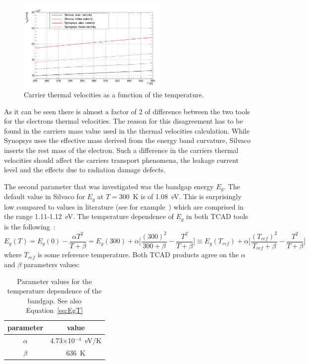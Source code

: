 \begin{figure}[!htbp]
\centering
\includegraphics[width=0.65\textwidth]{vtherm}
\caption{\label{fig:vtherm}Carrier thermal velocities as a function of the temperature.}
\end{figure}
\noindent As it can be seen there is almost a factor of 2 of difference between the two tools for the electrons 
thermal velocities. The reason for this disagreement has to be found in the carriers  mass value
used in the thermal velocities calculation. While Synopsys uses the effective  mass derived 
from the energy band curvature, Silvaco inserts the rest mass of the electron. 
Such a difference in the  carriers thermal velocities should affect the carriers transport phenomena, 
the leakage current level and the effects due to radiation damage defects. 
 
 The second parameter that was investigated was the bandgap energy $E_g$. The default value in 
 Silvaco for $E_g$ at $T=$300~K is of 1.08~eV. This is surprisingly low compared to values in literature 
 (see for example~\cite{Lutz:411172,Sze1981,Wang1989,Shockley}) which are comprised 
 in the range 1.11-1.12~eV.
The temperature dependence of $E_g$ in both TCAD tools is the following~\cite{Sze1981}:
\begin{equation}
E_g(T)=E_g(0) -\dfrac{\alpha T^2}{T+\beta}=E_g(300)+\alpha\Bigg[ \dfrac{(300)^2}{300+\beta}-\dfrac{T^2}{T+\beta}  \Bigg] \equiv E_g(T_{ref})+\alpha\Bigg[ \dfrac{(T_{ref})^2}{T_{ref}+\beta}-\dfrac{T^2}{T+\beta}  \Bigg] 
\label{eq:EgT}
\end{equation}
where $T_{ref}$ is some reference temperature.
Both TCAD products agree on the $\alpha$ and $\beta$ parameters values:

\begin{table}[!htbp]
\caption{\label{eq:Egalphabeta}Parameter values for the temperature dependence of the bandgap. 
See also Equation~\ref{eq:EgT}}
\centering
\begin{tabular}{cc}
\hline
parameter & value \\
\hline 
\hline
$\alpha$ & 4.73$\times$10$^{-4}$~eV/K \\
\hline 
$\beta$ & 636~K \\
\hline
\end{tabular}
\end{table}

